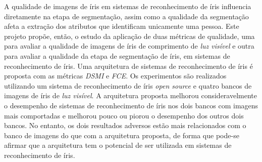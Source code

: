 A qualidade de imagens de íris em sistemas de reconhecimento de íris influencia diretamente na etapa de segmentação, assim como a qualidade da segmentação afeta a extração dos atributos que identificam unicamente uma pessoa.  Este projeto propõe, então, o estudo da aplicação de duas métricas de qualidade, uma para avaliar a qualidade de imagens de íris de comprimento de \textit{luz visível} e outra para avaliar a qualidade da etapa de segmentação de íris, em sistemas de reconhecimento de íris. Uma arquitetura de sistemas de reconhecimento de íris é proposta com as métricas \textit{\acrfull{DSMI}} e \textit{\acrfull{FCE}}. Os experimentos são realizados utilizando um sistema de reconhecimento de íris \textit{open source} e quatro bancos de imagens de íris de \textit{luz visível}. A arquitetura proposta melhorou consideravelmente o desempenho de sistemas de reconhecimento de íris nos dois bancos com imagens mais comportadas e melhorou pouco ou piorou o desempenho dos outros dois bancos. No entanto, os dois resultados adversos estão mais relacionados com o banco de imagens do que com a arquitetura proposta, de forma que pode-se afirmar que a arquitetura tem o potencial de ser utilizada em sistemas de reconhecimento de íris.
